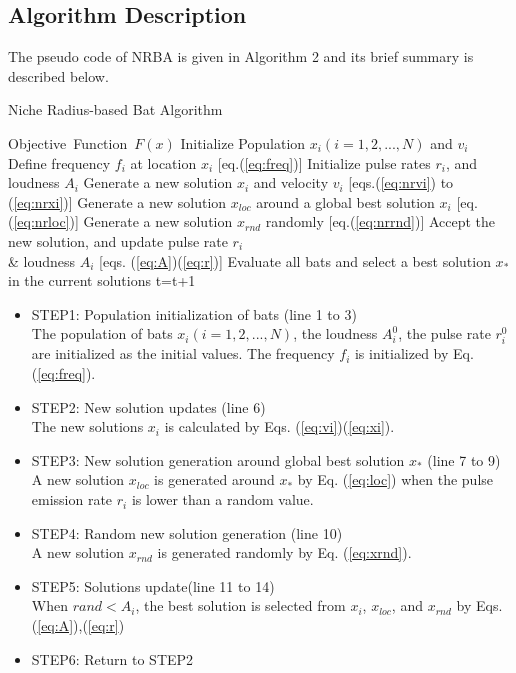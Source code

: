 \documentclass[conference]{IEEEtran}
\begin{document}
\subsection{Algorithm Description}
The pseudo code of NRBA is given in Algorithm 2 and its brief summary is described below.
\begin{algorithm}[H]
\caption{Niche Radius-based Bat Algorithm}
\label{code:ba}
\begin{algorithmic}[2]
\REQUIRE Objective\ Function\ $F(x)$
\STATE Initialize Population $x_i(i=1,2,..., N)$ and $v_i$\\
\STATE Define frequency $f_i$ at location $x_i$ [eq.(\ref{eq:freq})]
\STATE Initialize pulse rates $r_i$, and loudness $A_i$
\STATE Generate a new solution $x_i$ and velocity $v_i$ [eqs.(\ref{eq:nrvi}) to (\ref{eq:nrxi})]
\STATE Generate a new solution $x_{loc}$ around a global best solution $x_i$ [eq.(\ref{eq:nrloc})] 
\ENDIF
\STATE Generate a new solution $x_{rnd}$ randomly [eq.(\ref{eq:nrrnd})]
\STATE Accept the new solution, and update pulse rate $r_i$ \\ \& loudness $A_i$ [eqs. (\ref{eq:A})(\ref{eq:r})]  
\ENDIF
\STATE Evaluate all bats and select a best solution $x_*$ in the current solutions
\ENDFOR
\STATE t=t+1
\ENDWHILE
\end{algorithmic}
\end{algorithm}

\begin{itemize}
\item STEP1: Population initialization of bats (line 1 to 3)\\
The population of bats ${x_i}(i=1, 2, ..., N)$, the loudness ${A_i^0}$, the pulse rate ${r_i^0}$ are initialized as the initial values. The frequency ${f_i}$ is initialized by Eq.(\ref{eq:freq}).
\item STEP2: New solution updates (line 6)\\
The new solutions ${x_i}$ is calculated by Eqs. (\ref{eq:vi})(\ref{eq:xi}).
\item STEP3: New solution generation around global best solution ${x_*}$ (line 7 to 9)\\
A new solution $x_{loc}$ is generated around $x_*$ by Eq. (\ref{eq:loc}) when the pulse emission rate $r_i$ is lower than a random value.
\item STEP4: Random new solution generation (line 10)\\
A new solution ${x_{rnd}}$ is generated randomly by Eq. (\ref{eq:xrnd}).  
\item STEP5: Solutions update(line 11 to 14)\\
When ${rand < A_i}$, the best solution is selected from $x_i$, ${x_{loc}}$, and ${x_{rnd}}$ by Eqs.(\ref{eq:A}),(\ref{eq:r})
\item STEP6: Return to STEP2 
\end{itemize}
\end{document}
